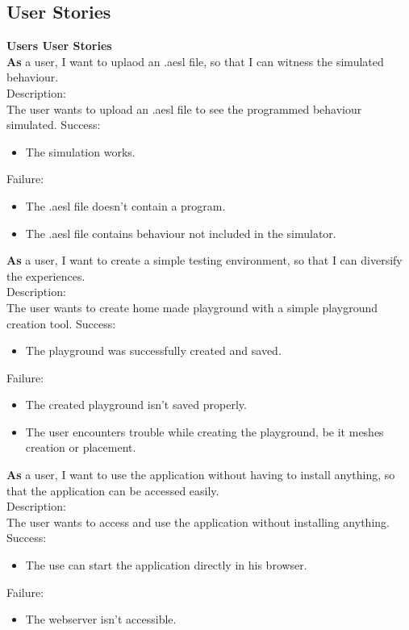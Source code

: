 \documentclass{scrartcl}
\begin{document}
\subsection{User Stories}
\textbf{\large Users User Stories}\\
\textbf{As} a user, I want to uplaod an .aesl file, so that I can witness the simulated behaviour. \\
Description:\\
The user wants to upload an .aesl file to see the programmed behaviour simulated.
Success:\\
\begin{itemize}
  \item The simulation works.
\end{itemize}
Failure:\\
\begin{itemize}
  \item The .aesl file doesn't contain a program.
  \item The .aesl file contains behaviour not included in the simulator.
\end{itemize}


\textbf{As} a user, I want to create a simple testing environment, so that I can diversify the experiences. \\
Description:\\
The user wants to create home made playground with a simple playground creation tool.
Success:\\
\begin{itemize}
  \item The playground was successfully created and saved.
\end{itemize}
Failure:\\
\begin{itemize}
  \item The created playground isn't saved properly.
  \item The user encounters trouble while creating the playground, be it meshes creation or placement.
\end{itemize}


\textbf{As} a user, I want to use the application without having to install anything, so that the application can be accessed easily. \\
Description:\\
The user wants to access and use the application without installing anything.
Success:\\
\begin{itemize}
  \item The use can start the application directly in his browser.
\end{itemize}
Failure:\\
\begin{itemize}
  \item The webserver isn't accessible.
\end{itemize}
\end{document}
